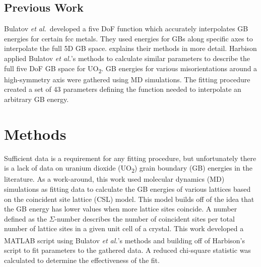 \documentclass[twoside,senior]{BYUPhys}
\begin{document}
\section{Previous Work\label{intro:prevWork}}
Bulatov \emph{et al.}\cite{bulatov2014}\ developed a five DoF function which accurately interpolates GB energies for certain fcc metals.  They used energies for GBs along specific axes to interpolate the full 5D GB space.   explains their methods in more detail.  Harbison\cite{harbison2015} applied Bulatov \emph{et al.}'s methods to calculate similar parameters to describe the full five DoF GB space for UO\textsubscript{2}.  GB energies for various misorientations around a high-symmetry axis were gathered using MD simulations.  The fitting procedure created a set of 43 parameters defining the function needed to interpolate an arbitrary GB energy.

\chapter{Methods\label{methods}}
Sufficient data is a requirement for any fitting procedure, but unfortunately there is a lack of data on uranium dioxide (UO\textsubscript{2}) grain boundary (GB) energies in the literature.  As a work-around, this work used molecular dynamics (MD) simulations\cite{zhang2016,hansen2016} as fitting data to calculate the GB energies of various lattices based on the coincident site lattice (CSL) model. This model builds off of the idea that the GB energy has lower values when more lattice sites coincide.  A number defined as the $\Sigma$-number describes the number of coincident sites per total number of lattice sites in a given unit cell of a crystal.\cite{lejcek2010, rohrer2011} This work developed a MATLAB\textsuperscript{\textregistered} script using Bulatov \emph{et al.}'s methods\cite{bulatov2014} and building off of Harbison's\cite{harbison2015} script to fit parameters to the gathered data.  A reduced chi-square statistic was calculated to determine the effectiveness of the fit.
\end{document}
